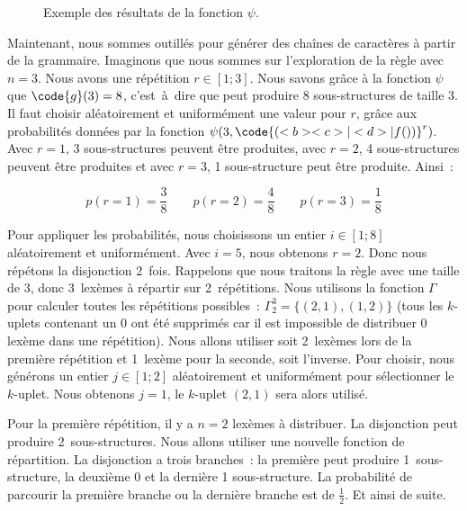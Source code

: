 \begin{example}
\begin{figure}
\begin{center}
\begin{tabular}{c|cc|cccccccccccc}
\hline

\end{tabular}
\end{center}

\caption{\label{figure:data:random_tabular} Exemple des résultats de la fonction
$\psi$.}

\end{figure}

Maintenant, nous sommes outillés pour générer des chaînes de caractères à partir
de la grammaire. Imaginons que nous sommes sur l'exploration de la règle
 avec $n = 3$. Nous avons une répétition $r \in [1; 3]$. Nous savons
grâce à la fonction $\psi$ que $\code{g}(3) = 8$, c'est~à~dire que  peut
produire 8 sous-structures de taille 3. Il faut choisir aléatoirement et
uniformément une valeur pour $r$, grâce aux probabilités données par la fonction
$\psi(3, \code{( <b> <c> | <d> | f() )}^r)$. Avec $r = 1$, 3 sous-structures
peuvent être produites, avec $r = 2$, 4 sous-structures peuvent être produites
et avec $r = 3$, 1 sous-structure peut être produite. Ainsi~:

$$
p(r = 1) = \frac{3}{8} \qquad
p(r = 2) = \frac{4}{8} \qquad
p(r = 3) = \frac{1}{8}
$$

Pour appliquer les probabilités, nous choisissons un entier $i \in [1; 8]$
aléatoirement et uniformément. Avec $i = 5$, nous obtenons $r = 2$.
%
%
%
%
%
%
%
%
Donc nous répétons la disjonction 2~fois. Rappelons que nous traitons la règle
 avec une taille de 3, donc 3~lexèmes à répartir sur 2~répétitions. Nous
utilisons la fonction $\Gamma$ pour calculer toutes les répétitions possibles~:
$\Gamma_2^3 = \{(2, 1), (1, 2)\}$ (tous les $k$-uplets contenant un 0 ont été
supprimés car il est impossible de distribuer 0 lexème dans une répétition).
Nous allons utiliser soit 2~lexèmes lors de la première répétition et 1~lexème
pour la seconde, soit l'inverse. Pour choisir, nous générons un entier $j \in
[1; 2]$ aléatoirement et uniformément pour sélectionner le $k$-uplet. Nous
obtenons $j = 1$, le $k$-uplet $(2, 1)$ sera alors utilisé.

Pour la première répétition, il y a $n = 2$ lexèmes à distribuer. La disjonction
peut produire 2~sous-structures. Nous allons utiliser une nouvelle fonction de
répartition. La disjonction a trois branches~: la première peut produire
1~sous-structure, la deuxième 0 et la dernière 1 sous-structure.  La probabilité
de parcourir la première branche ou la dernière branche est de $\tfrac{1}{2}$.
Et ainsi de suite.

\end{example}

